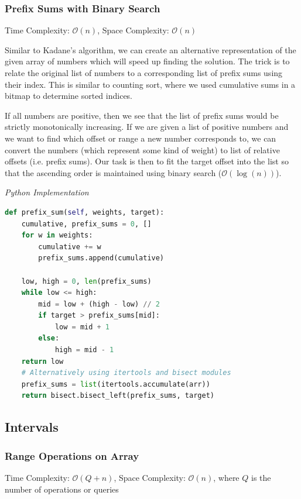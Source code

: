 \documentclass{article}
\newcommand{\bigO}{\mathcal{O}}
\begin{document}
    \subsubsection{Prefix Sums with Binary Search}
    Time Complexity: $\bigO(n)$, Space Complexity: $\bigO(n)$
    
    Similar to Kadane's algorithm, we can create an alternative representation of the given array of numbers which will speed up finding the solution. The trick is to relate the original list of numbers to a corresponding list of prefix sums using their index. This is similar to counting sort, where we used cumulative sums in a bitmap to determine sorted indices.
    
    If all numbers are positive, then we see that the list of prefix sums would be strictly monotonically increasing. If we are given a list of positive numbers and we want to find which offset or range a new number corresponds to, we can convert the numbers (which represent some kind of weight) to list of relative offsets (i.e. prefix sums). Our task is then to fit the target offset into the list so that the ascending order is maintained using binary search ($\bigO(\log(n))$).

\vspace{8pt} \emph{Python Implementation}
\begin{lstlisting}[language=Python]
def prefix_sum(self, weights, target):
    cumulative, prefix_sums = 0, []
    for w in weights:
        cumulative += w
        prefix_sums.append(cumulative)

    low, high = 0, len(prefix_sums)
    while low <= high:
        mid = low + (high - low) // 2
        if target > prefix_sums[mid]:
            low = mid + 1
        else:
            high = mid - 1
    return low
    # Alternatively using itertools and bisect modules
    prefix_sums = list(itertools.accumulate(arr)) 
    return bisect.bisect_left(prefix_sums, target)
\end{lstlisting}

\subsection{Intervals}
    \subsubsection{Range Operations on Array}
    Time Complexity: $\bigO(Q + n)$, Space Complexity: $\bigO(n)$, where $Q$ is the number of operations or queries
    
\end{document}

